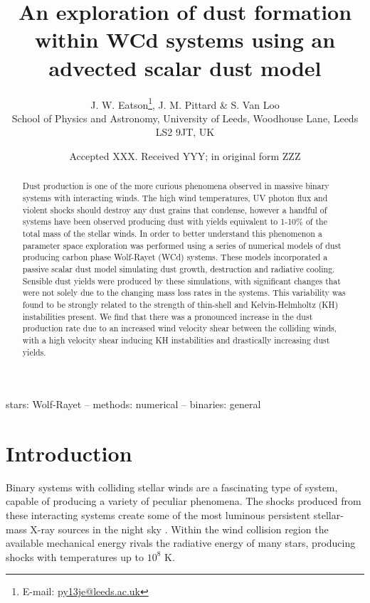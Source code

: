 \documentclass[fleqn,usenatbib]{mnras}
\title[Dust formation simulations in WCd systems]{An exploration of dust formation within WCd systems using an advected scalar dust model}
\author[J. W. Eatson et al.]{
J. W. Eatson\thanks{E-mail: \href{mailto:py13je@leeds.ac.uk}{py13je@leeds.ac.uk}},
J. M. Pittard \&
S. Van Loo
\\
School of Physics and Astronomy, University of
       Leeds, Woodhouse Lane, Leeds LS2 9JT, UK\\  
}
\date{Accepted XXX. Received YYY; in original form ZZZ}
\begin{document}
\label{firstpage}
\pagerange{\pageref{firstpage}--\pageref{lastpage}}
\maketitle

\begin{abstract}
\noindent
Dust production is one of the more curious phenomena observed in massive binary systems with interacting winds.
The high wind temperatures, UV photon flux and violent shocks should destroy any dust grains that condense, however a handful of systems have been observed producing dust with yields equivalent to 1-10\% of the total mass of the stellar winds.
In order to better understand this phenomenon a parameter space exploration was performed using a series of numerical models of dust producing carbon phase Wolf-Rayet (WCd) systems.
These models incorporated a passive scalar dust model simulating dust growth, destruction and radiative cooling.
Sensible dust yields were produced by these simulations, with significant changes that were not solely due to the changing mass loss rates in the systems.
This variability was found to be strongly related to the strength of thin-shell and Kelvin-Helmholtz (KH) instabilities present.
We find that there was a pronounced increase in the dust production rate due to an increased wind velocity shear between the colliding winds, with a high velocity shear inducing KH instabilities and drastically increasing dust yields.

\end{abstract}

\begin{keywords}
stars: Wolf-Rayet -- methods: numerical -- binaries: general
\end{keywords}



\section{Introduction}

Binary systems with colliding stellar winds are a fascinating type of system, capable of producing a variety of peculiar phenomena.
The shocks produced from these interacting systems create some of the most luminous persistent stellar-mass X-ray sources in the night sky \citep{rossloweSpatialDistributionGalactic2015}.
Within the wind collision region the available mechanical energy rivals the radiative energy of many stars, producing shocks with temperatures up to $10^8$ \si{\kelvin}.
\end{document}

